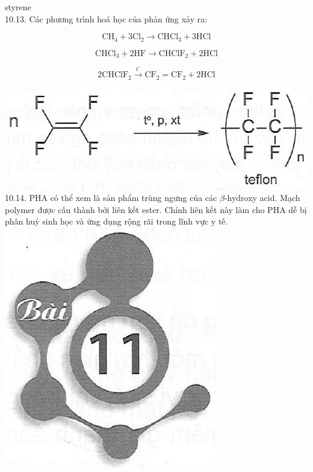 \documentclass[10pt]{article}
\begin{document}
styrene\\
10.13. Các phương trình hoá học của phản ứng xảy ra:

$$
\mathrm{CH}_{4}+3 \mathrm{Cl}_{2} \longrightarrow \mathrm{CHCl}_{3}+3 \mathrm{HCl}
$$

$$
\mathrm{CHCl}_{3}+2 \mathrm{HF} \longrightarrow \mathrm{CHClF}_{2}+2 \mathrm{HCl}
$$

$$
2 \mathrm{CHClF}_{2} \xrightarrow{\mathrm{t}^{\circ}} \mathrm{CF}_{2}=\mathrm{CF}_{2}+2 \mathrm{HCl}
$$

\includegraphics[max width=\textwidth, center]{2025_10_23_b4e16b74380d0f7e7700g-067}\\
10.14. PHA có thể xem là sản phẩm trùng ngưng của các $\beta$-hydroxy acid. Mạch polymer được cấu thành bởi liên kết ester. Chính liên kết này làm cho PHA dễ bị phân huỷ sinh học và ứng dụng rộng rãi trong lĩnh vực y tế.\\
\includegraphics[max width=\textwidth, center]{2025_10_23_b4e16b74380d0f7e7700g-067(1)}
\end{document}
